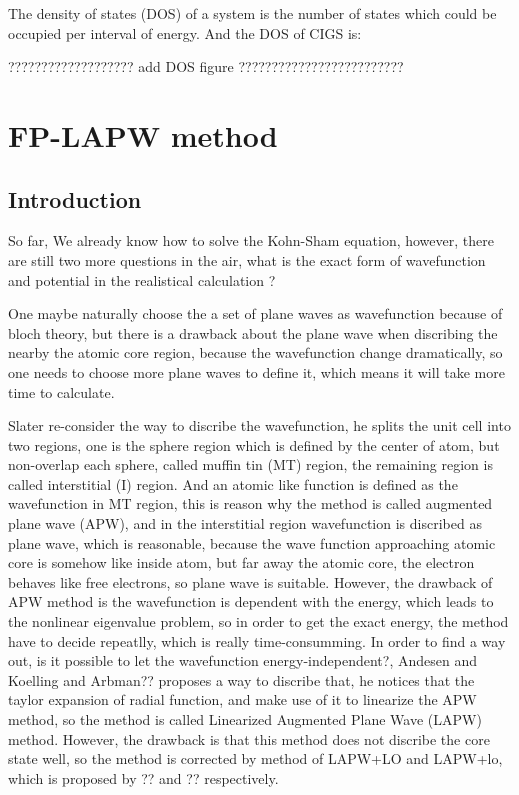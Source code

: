 \documentclass[a4paper, 12pt, titlepage,oneside,drop]{kthesis}
\begin{document}
\noindent The density of states (DOS) of a system is the number of states which could be occupied per interval of energy. And the DOS of CIGS is: 

{\color{red}??????????????????? add DOS figure ?????????????????????????} 





\chapter{FP-LAPW method}
\section{Introduction}
\noindent So far, We already know how to solve the Kohn-Sham equation, however, there are still two more questions in the air, what is the exact form of 
wavefunction and potential in the realistical calculation ?  

\noindent One maybe naturally choose the a set of plane waves as wavefunction because of bloch theory, but there is a drawback about the plane wave 
when discribing the nearby the atomic core region, because the wavefunction change dramatically, so one needs to choose more plane
waves to define it, which means it will take more time to calculate.

\noindent Slater re-consider the way to discribe the wavefunction, he splits the unit cell into two regions, one is the sphere region which is
defined by the center of atom, but non-overlap each sphere, called muffin tin (MT) region, the remaining region is called interstitial 
(I) region. And an atomic like function is defined as the wavefunction in MT region, this is reason why the method is called augmented plane wave (APW),
 and in the interstitial region wavefunction is discribed as plane wave, which is reasonable, because the wave 
function approaching atomic core is somehow like inside atom, but far away the atomic core, the electron behaves like free electrons,
 so plane wave is suitable. However, the drawback of APW method is the wavefunction is dependent with the energy, which leads to the 
nonlinear eigenvalue problem, so in order to get the exact energy, the method have to decide repeatlly, which is really time-consumming.
\noindent In order to find a way out, is it possible to let the wavefunction energy-independent?, Andesen and Koelling and Arbman?? proposes a way to discribe that, he notices that
the taylor expansion of radial function, and make use of it to linearize the APW method, so the method is called Linearized Augmented Plane Wave (LAPW) method.
However, the drawback is that this method does not discribe the core state well, so the method is corrected by method of LAPW+LO and LAPW+lo, which is proposed by ?? and ?? respectively.
\end{document}
